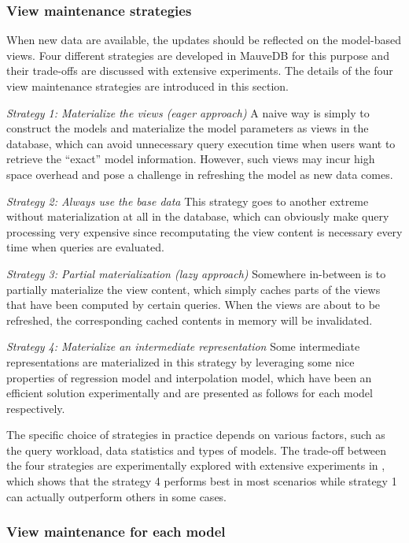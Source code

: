 \subsubsection{View maintenance strategies}
When new data are available, the updates should be reflected on the model-based views. Four different strategies are developed in MauveDB for this purpose and their trade-offs are discussed with extensive experiments. The details of the four view maintenance strategies are introduced in this section.

\textit{Strategy 1: Materialize the views (eager approach)}
A naive way is simply to construct the models and materialize the model parameters as views in the database, which can avoid unnecessary query execution time when users want to retrieve the ``exact'' model information. However, such views may incur high space overhead and pose a challenge in refreshing the model as new data comes.

\textit{Strategy 2: Always use the base data }
This strategy goes to another extreme without materialization at all in the database, which can obviously make query processing very expensive since recomputating the view content is necessary every time when queries are evaluated. 

\textit{Strategy 3: Partial materialization (lazy approach)}
Somewhere in-between is to partially materialize the view content, which simply caches parts of the views that have been computed by certain queries. When the views are about to be refreshed, the corresponding cached contents in memory will be invalidated.

\textit{Strategy 4: Materialize an intermediate representation}
Some intermediate representations are materialized in this strategy by leveraging some nice properties of regression model and interpolation model, which have been an efficient solution experimentally and are presented as follows for each model respectively.

The specific choice of strategies in practice depends on various factors, such as the query workload, data statistics and types of models. The trade-off between the four strategies are experimentally explored with extensive experiments in \cite{deshpande2006mauvedb}, which shows that the strategy 4 performs best in most scenarios while strategy 1 can actually outperform others in some cases.

\subsubsection{View maintenance for each model}
